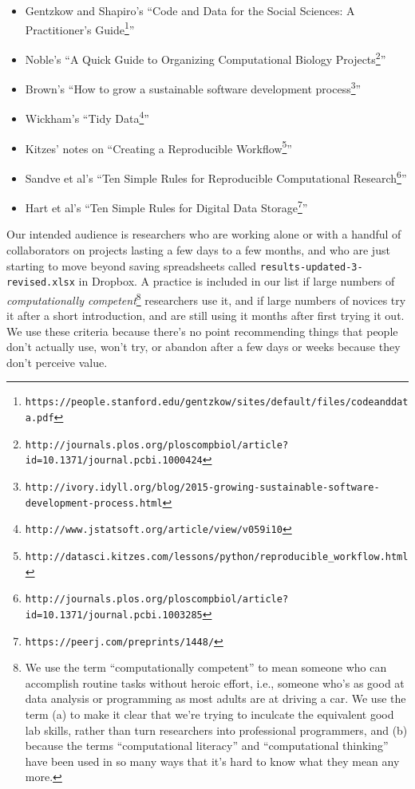 \documentclass[10pt]{article}
\newcommand{\withurl}[2]{{#1}\footnote{\texttt{#2}}}
\begin{document}
\begin{itemize}
\itemsep1pt\parskip0pt
\item
  Gentzkow and Shapiro's ``\withurl{Code and Data for the Social
    Sciences: A Practitioner's
    Guide}{https://people.stanford.edu/gentzkow/sites/default/files/codeanddata.pdf}''
\item
  Noble's ``\withurl{A Quick Guide to Organizing Computational Biology
    Projects}{http://journals.plos.org/ploscompbiol/article?id=10.1371/journal.pcbi.1000424}''
\item
  Brown's ``\withurl{How to grow a sustainable software development
    process}{http://ivory.idyll.org/blog/2015-growing-sustainable-software-development-process.html}''
\item
  Wickham's ``\withurl{Tidy
    Data}{http://www.jstatsoft.org/article/view/v059i10}''
\item
  Kitzes' notes on ``\withurl{Creating a Reproducible
    Workflow}{http://datasci.kitzes.com/lessons/python/reproducible\_workflow.html}''
\item
  Sandve et al's ``\withurl{Ten Simple Rules for Reproducible
    Computational
    Research}{http://journals.plos.org/ploscompbiol/article?id=10.1371/journal.pcbi.1003285}''
\item
  Hart et al's ``\withurl{Ten Simple Rules for Digital Data
    Storage}{https://peerj.com/preprints/1448/}''
\end{itemize}

Our intended audience is researchers who are working alone or with a
handful of collaborators on projects lasting a few days to a few
months, and who are just starting to move beyond saving spreadsheets
called \texttt{results-updated-3-revised.xlsx} in Dropbox. A practice
is included in our list if large numbers of \emph{computationally
  competent}\footnote{We use the term ``computationally competent'' to
  mean someone who can accomplish routine tasks without heroic effort,
  i.e., someone who's as good at data analysis or programming as most
  adults are at driving a car.  We use the term (a) to make it clear
  that we're trying to inculcate the equivalent good lab skills,
  rather than turn researchers into professional programmers, and (b)
  because the terms ``computational literacy'' and ``computational
  thinking'' have been used in so many ways that it's hard to know
  what they mean any more.} researchers use it, and if large numbers
of novices try it after a short introduction, and are still using it
months after first trying it out. We use these criteria because
there's no point recommending things that people don't actually use,
won't try, or abandon after a few days or weeks because they don't
perceive value.
\end{document}
